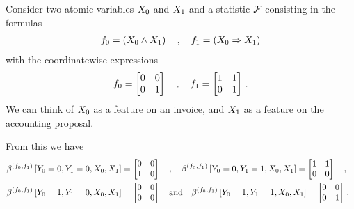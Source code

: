 \begin{example}

    Consider two atomic variables $X_{0}$ and $X_{1}$ and a statistic $\mathcal{F}$ consisting in the formulas
    \begin{align*}
        f_{0} = \left( X_{0} \land X_{1} \right) \quad, \quad f_{1} = \left( X_{0} \Rightarrow X_{1} \right)
    \end{align*}
    with the coordinatewise expressions
    \begin{align*}
        f_{0} =
        \begin{bmatrix}
            0 & 0 \\
            0 & 1
        \end{bmatrix}
        \quad, \quad
        f_{1} =
        \begin{bmatrix}
            1 & 1 \\
            0 & 1
        \end{bmatrix} \, .
    \end{align*}
    We can think of $X_{0}$ as a feature on an invoice, and $X_{1}$ as a feature on the accounting proposal.

    From this we have
    \begin{align*}
        &\beta^{(f_{0},f_{1})}\left[Y_{0}=0,Y_{1}=0,X_{0},X_{1}\right] =
        \begin{bmatrix}
            0 & 0 \\
            1 & 0
        \end{bmatrix} \quad, \quad
        \beta^{(f_{0},f_{1})}\left[Y_{0}=0,Y_{1}=1,X_{0},X_{1}\right] =
        \begin{bmatrix}
            1 & 1 \\
            0 & 0
        \end{bmatrix} \quad, \quad \\
        &\beta^{(f_{0},f_{1})}\left[Y_{0}=1,Y_{1}=0,X_{0},X_{1}\right] =
        \begin{bmatrix}
            0 & 0 \\
            0 & 0
        \end{bmatrix} \quad \text{and} \quad
        \beta^{(f_{0},f_{1})}\left[Y_{0}=1,Y_{1}=1,X_{0},X_{1}\right] =
        \begin{bmatrix}
            0 & 0 \\
            0 & 1
        \end{bmatrix} \, .
    \end{align*}


\end{example}
